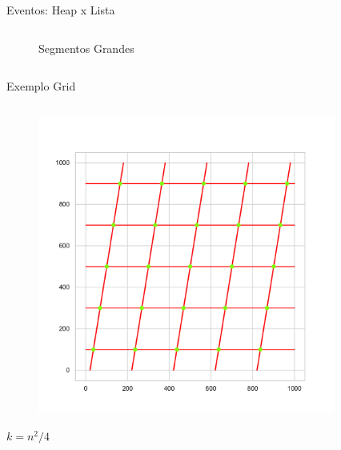 \documentclass[aspectratio=169,usenames,dvipsnames]{beamer}
\begin{document}
\begin{frame}{ Eventos: Heap x Lista}
\begin{columns}
\begin{column}{0.4\textwidth}
\begin{figure}
        \caption{Segmentos Grandes}
      \end{figure}
    \end{column}
  \end{columns}
 

\end{frame}


\begin{frame}{Exemplo Grid}
  \begin{columns}
    \begin{column}{0.35\textwidth}
    \begin{center}
      \begin{figure}
        \includegraphics[width=\textwidth]{figs/exemplos/grid_example_10_interserctions.pdf}
      \end{figure}
      $k = n^2/4$
    \end{center}
    \end{column}
    \begin{column}{0.65\textwidth}
      \begin{figure}

\end{figure}
\end{column}
\end{columns}
\end{frame}
\end{document}
